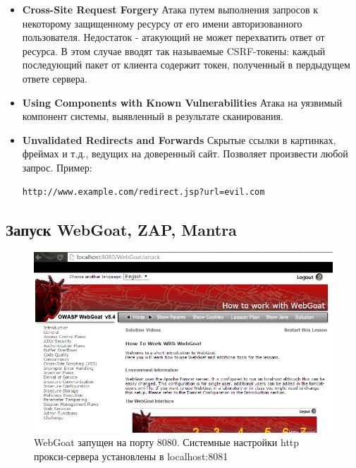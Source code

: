 \documentclass[a4paper, 14pt]{article}				%
\begin{document}
\begin{itemize}
{Доступ к функции admin\_getappInfo должен иметь только администратор. Соответственно, если пользователь, не являющийся администритором получает доступ к данной функции - это уязвимость.}

\item {\textbf{Cross-Site Request Forgery} Атака путем выполнения запросов к некоторому защищенному ресурсу от его имени авторизованного пользователя. Недостаток - атакующий не может перехватить ответ от ресурса. В этом случае вводят так называемые CSRF-токены: каждый последующий пакет от клиента содержит токен, полученный в пердыдущем ответе сервера.}

\item {\textbf{Using Components with Known Vulnerabilities} Атака на уязвимый компонент системы, выявленный в результате сканирования.}

\item {\textbf{Unvalidated Redirects and Forwards} Скрытые ссылки в картинках, фреймах и т.д., ведущих на доверенный сайт. Позволяет произвести любой запрос.
Пример:
\begin{Verbatim}[frame=single]
http://www.example.com/redirect.jsp?url=evil.com
\end{Verbatim}
}
\end{itemize}

\subsection{Запуск WebGoat, ZAP, Mantra}
\begin{figure}[h!]
\centering
\includegraphics[width=\textwidth]{rsrc/webgoat_start}
\caption{WebGoat запущен на порту 8080. Системные настройки http прокси-сервера установлены в localhost:8081}
\end{figure}
\end{document}
